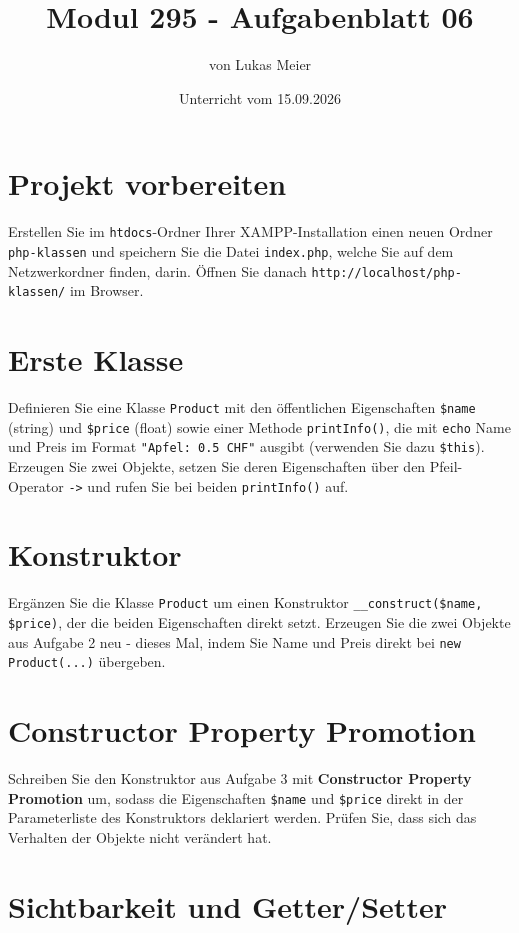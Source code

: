 \documentclass[a4paper,12pt]{article}
\title{Modul 295 - Aufgabenblatt 06}
\author{von Lukas Meier}
\date{Unterricht vom 15.09.2026}
\begin{document}
\maketitle

\section{Projekt vorbereiten}

Erstellen Sie im \texttt{htdocs}-Ordner Ihrer XAMPP-Installation einen neuen Ordner \texttt{php-klassen} und speichern Sie die Datei \texttt{index.php}, welche Sie auf dem Netzwerkordner finden, darin. Öffnen Sie danach \texttt{http://localhost/php-klassen/} im Browser.

\section{Erste Klasse}

Definieren Sie eine Klasse \texttt{Product} mit den öffentlichen Eigenschaften \texttt{\$name} (string) und \texttt{\$price} (float) sowie einer Methode \texttt{printInfo()}, die mit \texttt{echo} Name und Preis im Format \texttt{"{}Apfel: 0.5 CHF"} ausgibt (verwenden Sie dazu \texttt{\$this}). Erzeugen Sie zwei Objekte, setzen Sie deren Eigenschaften über den Pfeil-Operator \texttt{->} und rufen Sie bei beiden \texttt{printInfo()} auf.

\section{Konstruktor}

Ergänzen Sie die Klasse \texttt{Product} um einen Konstruktor \texttt{\_\_construct(\$name, \$price)}, der die beiden Eigenschaften direkt setzt. Erzeugen Sie die zwei Objekte aus Aufgabe 2 neu - dieses Mal, indem Sie Name und Preis direkt bei \texttt{new Product(...)} übergeben.

\section{Constructor Property Promotion}

Schreiben Sie den Konstruktor aus Aufgabe 3 mit \textbf{Constructor Property Promotion} um, sodass die Eigenschaften \texttt{\$name} und \texttt{\$price} direkt in der Parameterliste des Konstruktors deklariert werden. Prüfen Sie, dass sich das Verhalten der Objekte nicht verändert hat.

\section{Sichtbarkeit und Getter/Setter}
\end{document}
